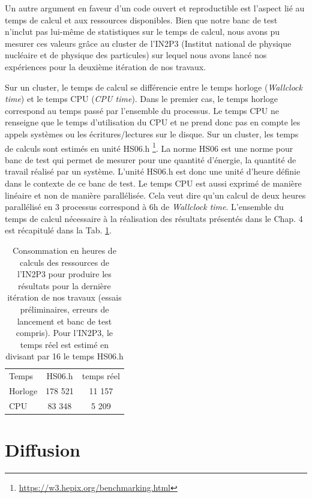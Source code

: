 Un autre argument en faveur d'un code ouvert et reproductible est l'aspect lié au temps de calcul et aux ressources disponibles. Bien que notre banc de test n'inclut pas lui-même de statistiques sur le temps de calcul, nous avons pu mesurer ces valeurs grâce au cluster de l'IN2P3 (Institut national de physique nucléaire et de physique des particules) sur lequel nous avons lancé nos expériences pour la deuxième itération de nos travaux. 

Sur un cluster, le temps de calcul se différencie entre le temps horloge (\textit{Wallclock time}) et le temps CPU (\textit{CPU time}). Dans le premier cas, le temps horloge correspond au temps passé par l'ensemble du processus. Le temps CPU ne renseigne que le temps d'utilisation du CPU et ne prend donc pas en compte les appels systèmes ou les écritures/lectures sur le disque. Sur un cluster, les temps de calculs sont estimés en unité HS06.h \footnote{\url{https://w3.hepix.org/benchmarking.html}}. La norme HS06 est une norme pour banc de test qui permet de mesurer pour une quantité d'énergie, la quantité de travail réalisé par un système. L'unité HS06.h est donc une unité d'heure définie dans le contexte de ce banc de test. Le temps CPU est aussi exprimé de manière linéaire et non de manière parallélisée. Cela veut dire qu'un calcul de deux heures parallélisé en 3 processus correspond à 6h de \textit{Wallclock time}. L'ensemble du temps de calcul nécessaire à la réalisation des résultats présentés dans le Chap. 4 est récapitulé dans la Tab. \ref{tab:consumption_in2p3}.

\begin{table}
    \centering
    \begin{tabular}{lcc}
        \hline
        Temps         & HS06.h   & temps réel \\
        Horloge       &  178 521 &    11 157  \\
        CPU           &  83 348  &     5 209  \\
    \end{tabular}
    \caption{Consommation en heures de calculs des ressources de l'IN2P3 pour produire les résultats pour la dernière itération de nos travaux (essais préliminaires, erreurs de lancement et banc de test compris). Pour l'IN2P3, le temps réel est estimé en divisant par 16 le temps HS06.h}
    \label{tab:consumption_in2p3}
\end{table}


\section{Diffusion}

